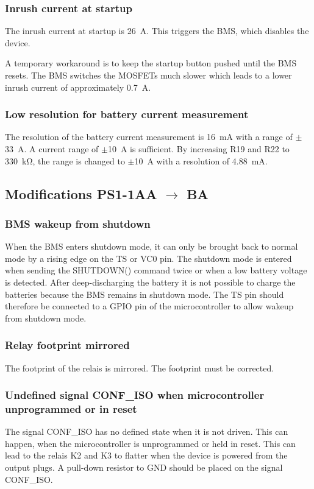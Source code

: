 \subsubsection{Inrush current at startup}
The inrush current at startup is \qty{26}{\ampere}. This triggers the BMS, which disables the device. 

A temporary workaround is to keep the startup button pushed until the BMS resets. The BMS switches the \acp{MOSFET} much slower which leads to a lower inrush current of approximately \qty{0.7}{\ampere}. 


\subsubsection{Low resolution for battery current measurement}
The resolution of the battery current measurement is \qty{16}{\milli\ampere} with a range of $\pm$\qty{33}{\ampere}. A current range of $\pm$\qty{10}{\ampere} is sufficient. By increasing R19 and R22 to \qty{330}{\kilo\ohm}, the range is changed to $\pm$\qty{10}{\ampere} with a resolution of \qty{4.88}{\milli\ampere}. 

\subsection{Modifications PS1-1AA $\to$ BA}

\subsubsection{BMS wakeup from shutdown}
When the BMS enters shutdown mode, it can only be brought back to normal mode by a rising edge on the TS or VC0 pin. The shutdown mode is entered when sending the SHUTDOWN() command twice or when a low battery voltage is detected. After deep-discharging the battery it is not possible to charge the batteries because the BMS remains in shutdown mode. The TS pin should therefore be connected to a GPIO pin of the microcontroller to allow wakeup from shutdown mode. 

\subsubsection{Relay footprint mirrored}
The footprint of the relais is mirrored. The footprint must be corrected. 

\subsubsection{Undefined signal CONF\_ISO when microcontroller unprogrammed or in reset}
The signal CONF\_ISO has no defined state when it is not driven. This can happen, when the microcontroller is unprogrammed or held in reset. This can lead to the relais K2 and K3 to flatter when the device is powered from the output plugs. 
A pull-down resistor to GND should be placed on the signal CONF\_ISO. 

